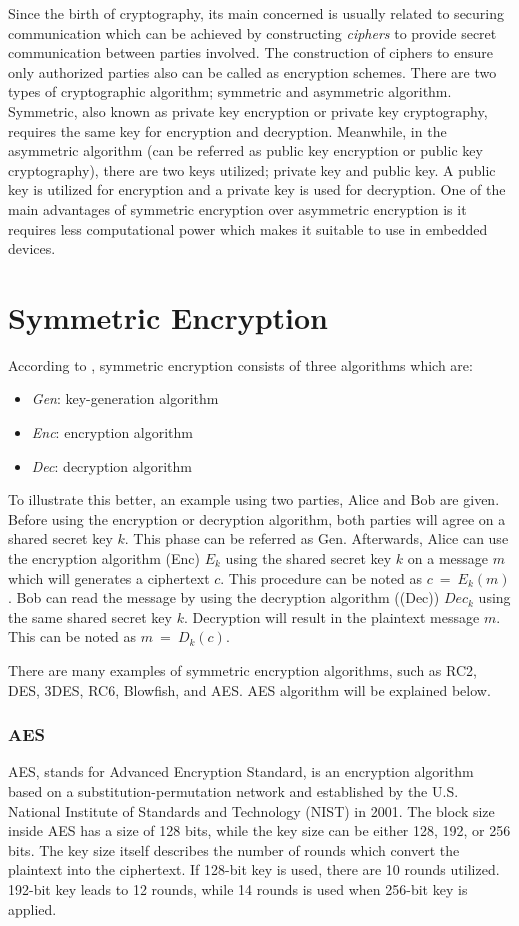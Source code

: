 Since the birth of cryptography, its main concerned is usually related to securing communication which can be achieved by constructing \textit{ciphers} to provide secret communication between parties involved. The construction of ciphers to ensure only authorized parties also can be called as encryption schemes.
There are two types of cryptographic algorithm; symmetric and asymmetric algorithm. Symmetric, also known as private key encryption or private key cryptography, requires the same key for encryption and decryption. Meanwhile, in the asymmetric algorithm (can be referred as public key encryption or public key cryptography), there are two keys utilized; private key and public key. A public key is utilized for encryption and a private key is used for decryption. One of the main advantages of symmetric encryption over asymmetric encryption is it requires less computational power which makes it suitable to use in embedded devices.

\section{Symmetric Encryption}

According to \cite{modern_cryptography}, symmetric encryption consists of three algorithms which are:
\begin{itemize}
    \item \large{\textit{Gen}}: key-generation algorithm
    \item \large{\textit{Enc}}: encryption algorithm
    \item \large{\textit{Dec}}: decryption algorithm
\end{itemize}
To illustrate this better, an example using two parties, Alice and Bob are given. Before using the encryption or decryption algorithm, both parties will agree on a shared secret key $k$. This phase can be referred as \large{Gen}.
Afterwards, Alice can use the encryption algorithm (\large{Enc}) $E_k$ using the shared secret key $k$ on a message $m$ which will generates a ciphertext $c$. This procedure can be noted as $c\ =\ E_k(m)$. Bob can read the message by using the decryption algorithm (\large(Dec)) $Dec_k$ using the same shared secret key $k$. Decryption will result in the plaintext message $m$. This can be noted as $m\ =\ D_k(c)$.


There are many examples of symmetric encryption algorithms, such as RC2, DES, 3DES, RC6, Blowfish, and AES. AES algorithm will be explained below.

\subsubsection{AES}
AES, stands for Advanced Encryption Standard, is an encryption algorithm based on a substitution-permutation network and established by the U.S. National Institute of Standards and Technology (NIST) in 2001.
The block size inside AES has a size of 128 bits, while the key size can be either 128, 192, or 256 bits. The key size  itself describes the number of rounds which convert the plaintext into the ciphertext. If 128-bit key is used, there are 10 rounds utilized. 192-bit key leads to 12 rounds, while 14 rounds is used when 256-bit key is applied.


